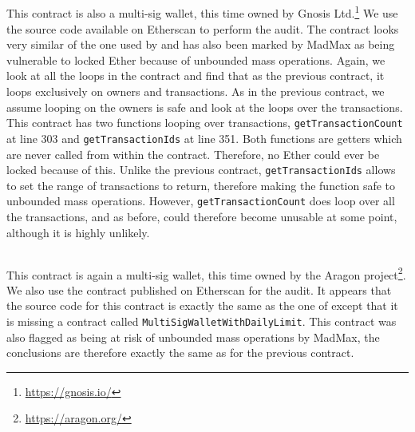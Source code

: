 \subsection*{}
This contract is also a multi-sig wallet, this time owned by Gnosis Ltd.\footnote{\url{https://gnosis.io/}} We use the source code available on Etherscan to perform the audit. The contract looks very similar of the one used by  and has also been marked by MadMax as being vulnerable to locked Ether because of unbounded mass operations. Again, we look at all the loops in the contract and find that as the previous contract, it loops exclusively on owners and transactions. As in the previous contract, we assume looping on the owners is safe and look at the loops over the transactions. This contract has two functions looping over transactions, \lstinline{getTransactionCount} at line 303 and \lstinline{getTransactionIds} at line 351. Both functions are getters which are never called from within the contract. Therefore, no Ether could ever be locked because of this. Unlike the previous contract, \lstinline{getTransactionIds} allows to set the range of transactions to return, therefore making the function safe to unbounded mass operations. However, \lstinline{getTransactionCount} does loop over all the transactions, and as before, could therefore become unusable at some point, although it is highly unlikely.

\subsection*{}
This contract is again a multi-sig wallet, this time owned by the Aragon project\footnote{\url{https://aragon.org/}}. We also use the contract published on Etherscan for the audit. It appears that the source code for this contract is exactly the same as the one of  except that it is missing a contract called \lstinline{MultiSigWalletWithDailyLimit}. This contract was also flagged as being at risk of unbounded mass operations by MadMax, the conclusions are therefore exactly the same as for the previous contract.

